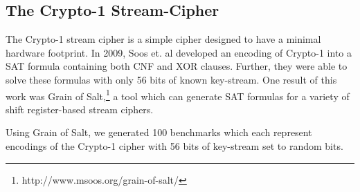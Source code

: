 \subsection{The Crypto-1 Stream-Cipher}
\label{sec:encoding:crypto1}

The Crypto-1 stream cipher is a simple cipher designed to have a minimal hardware footprint. In 2009, Soos et. al \cite{SNC09} developed an encoding of Crypto-1 into a SAT formula containing both CNF and XOR clauses. Further, they were able to solve these formulas with only 56 bits of known key-stream. One result of this work was Grain of Salt,\footnote{http://www.msoos.org/grain-of-salt/} a tool which can generate SAT formulas for a variety of shift register-based stream ciphers.

Using Grain of Salt, we generated 100 benchmarks which each represent encodings of the Crypto-1 cipher with 56 bits of key-stream set to random bits.
